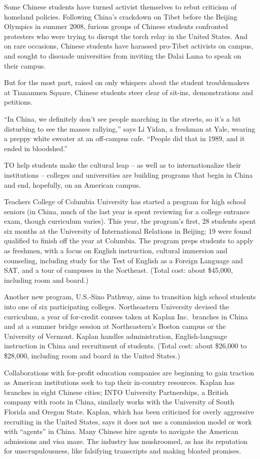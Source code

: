 ﻿\documentclass[12pt]{article}
\begin{document}
Some Chinese students have turned activist themselves to rebut criticism of homeland policies.
Following China's crackdown on Tibet before the Beijing Olympics in summer 2008, furious groups of
Chinese students confronted protesters who were trying to disrupt the torch relay in the United
States. And on rare occasions, Chinese students have harassed pro-Tibet activists on campus, and
sought to dissuade universities from inviting the Dalai Lama to speak on their campus.

But for the most part, raised on only whispers about the student troublemakers at Tiananmen Square,
Chinese students steer clear of sit-ins, demonstrations and petitions.

``In China, we definitely don't see people marching in the streets, so it's a bit disturbing to see
the masses rallying,'' says Li Yidan, a freshman at Yale, wearing a preppy white sweater at an
off-campus cafe. ``People did that in 1989, and it ended in bloodshed.''

TO help students make the cultural leap -- as well as to internationalize their institutions --
colleges and universities are building programs that begin in China and end, hopefully, on an
American campus.

Teachers College of Columbia University has started a program for high school seniors (in China,
much of the last year is spent reviewing for a college entrance exam, though curriculum varies).
This year, the program's first, 28 students spent six months at the University of International
Relations in Beijing; 19 were found qualified to finish off the year at Columbia. The program preps
students to apply as freshmen, with a focus on English instruction, cultural immersion and
counseling, including study for the Test of English as a Foreign Language and SAT, and a tour of
campuses in the Northeast. (Total cost: about \$45,000, including room and board.)

Another new program, U.S.-Sino Pathway, aims to transition high school students into one of six
participating colleges. Northeastern University devised the curriculum, a year of for-credit courses
taken at Kaplan Inc.~branches in China and at a summer bridge session at Northeastern's Boston
campus or the University of Vermont. Kaplan handles administration, English-language instruction in
China and recruitment of students. (Total cost: about \$26,000 to \$28,000, including room and board
in the United States.)

Collaborations with for-profit education companies are beginning to gain traction as American
institutions seek to tap their in-country resources. Kaplan has branches in eight Chinese cities;
INTO University Partnerships, a British company with roots in China, similarly works with the
University of South Florida and Oregon State. Kaplan, which has been criticized for overly
aggressive recruiting in the United States, says it does not use a commission model or work with
``agents'' in China. Many Chinese hire agents to navigate the American admissions and visa maze. The
industry has mushroomed, as has its reputation for unscrupulousness, like falsifying transcripts and
making bloated promises.
\end{document}

